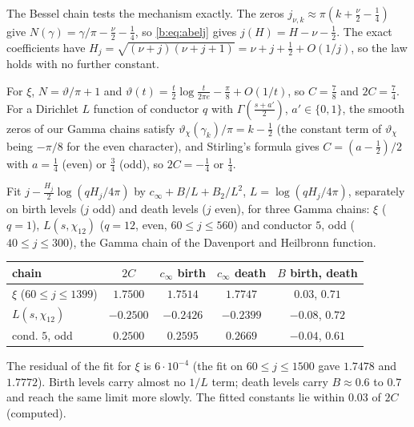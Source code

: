 The Bessel chain tests the mechanism exactly. The zeros $j_{\nu,k}\approx\pi(k+\frac\nu2-\frac14)$ give $N(\gamma)=\gamma/\pi-\frac\nu2-\frac14$, so \eqref{b:eq:abelj} gives $j(H)=H-\nu-\frac12$. The exact coefficients have $H_j=\sqrt{(\nu+j)(\nu+j+1)}=\nu+j+\frac12+O(1/j)$, so the law holds with no further constant.

For $\xi$, $N=\vartheta/\pi+1$ and $\vartheta(t)=\frac t2\log\frac{t}{2\pi e}-\frac\pi8+O(1/t)$, so $C=\frac78$ and $2C=\frac74$. For a Dirichlet $L$ function of conductor $q$ with $\Gamma(\frac{s+a'}{2})$, $a'\in\{0,1\}$, the smooth zeros of our Gamma chains satisfy $\vartheta_\chi(\gamma_k)/\pi=k-\frac12$ (the constant term of $\vartheta_\chi$ being $-\pi/8$ for the even character), and Stirling's formula gives $C=(a-\frac12)/2$ with $a=\frac14$ (even) or $\frac34$ (odd), so $2C=-\frac14$ or $\frac14$.

\begin{remark}\label{b:comp:c0}
Fit $j-\frac{H_j}2\log(qH_j/4\pi)$ by $c_\infty+B/L+B_2/L^2$, $L=\log(qH_j/4\pi)$, separately on birth levels ($j$ odd) and death levels ($j$ even), for three Gamma chains: $\xi$ ($q=1$), $L(s,\chi_{12})$ ($q=12$, even, $60\le j\le560$) and conductor $5$, odd ($40\le j\le300$), the Gamma chain of the Davenport and Heilbronn function.
\begin{center}\small
\begin{tabular}{@{}lcccc@{}}
\toprule
chain & $2C$ & $c_\infty$ birth & $c_\infty$ death & $B$ birth, death\\
\midrule
$\xi$ ($60\le j\le1399$) & $1.7500$ & $1.7514$ & $1.7747$ & $0.03$, $0.71$\\
$L(s,\chi_{12})$ & $-0.2500$ & $-0.2426$ & $-0.2399$ & $-0.08$, $0.72$\\
cond. $5$, odd & $0.2500$ & $0.2595$ & $0.2669$ & $-0.04$, $0.61$\\
\bottomrule
\end{tabular}
\end{center}
The residual of the fit for $\xi$ is $6\cdot10^{-4}$ (the fit on $60\le j\le1500$ gave $1.7478$ and $1.7772$). Birth levels carry almost no $1/L$ term; death levels carry $B\approx0.6$ to $0.7$ and reach the same limit more slowly. The fitted constants lie within $0.03$ of $2C$ (computed).
\end{remark}

